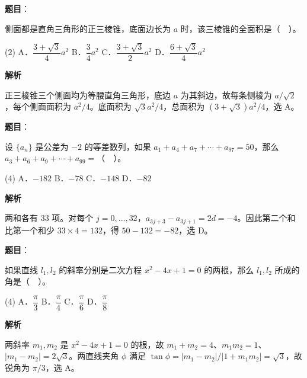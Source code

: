 \begin{answer}

\textbf{题目}：

侧面都是直角三角形的正三棱锥，底面边长为 $a$ 时，该三棱锥的全面积是（　）。

\begin{gkopts}(2)
\task A．$\dfrac{3+\sqrt3}4a^2$
\task B．$\dfrac34a^2$
\task C．$\dfrac{3+\sqrt3}2a^2$
\task D．$\dfrac{6+\sqrt3}4a^2$
\end{gkopts}

\textbf{解析}

正三棱锥三个侧面均为等腰直角三角形，底边 $a$ 为其斜边，故每条侧棱为 $a/\sqrt2$，每个侧面面积为 $a^2/4$。底面积为 $\sqrt3a^2/4$，总面积为 $(3+\sqrt3)a^2/4$，选 A。


\end{answer}
\begin{answer}

\textbf{题目}：

设 $\{a_n\}$ 是公差为 $-2$ 的等差数列，如果 $a_1+a_4+a_7+\cdots+a_{97}=50$，那么 $a_3+a_6+a_9+\cdots+a_{99}=$（　）。

\begin{gkopts}(4)
\task A．$-182$
\task B．$-78$
\task C．$-148$
\task D．$-82$
\end{gkopts}

\textbf{解析}

两和各有 33 项。对每个 $j=0,\ldots,32$，$a_{3j+3}-a_{3j+1}=2d=-4$。因此第二个和比第一个和少 $33\times4=132$，得 $50-132=-82$，选 D。


\end{answer}
\begin{answer}

\textbf{题目}：

如果直线 $l_1,l_2$ 的斜率分别是二次方程 $x^2-4x+1=0$ 的两根，那么 $l_1,l_2$ 所成的角是（　）。

\begin{gkopts}(4)
\task A．$\dfrac\pi3$
\task B．$\dfrac\pi4$
\task C．$\dfrac\pi6$
\task D．$\dfrac\pi8$
\end{gkopts}

\textbf{解析}

两斜率 $m_1,m_2$ 是 $x^2-4x+1=0$ 的根，故 $m_1+m_2=4$、$m_1m_2=1$、$|m_1-m_2|=2\sqrt3$。两直线夹角 $\phi$ 满足 $\tan\phi=|m_1-m_2|/|1+m_1m_2|=\sqrt3$，故锐角为 $\pi/3$，选 A。


\end{answer}
